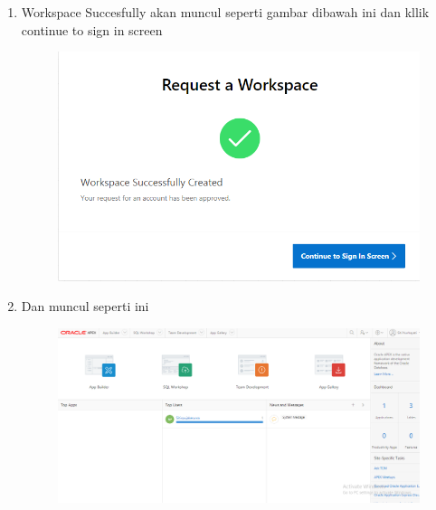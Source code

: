 \begin{enumerate}
	\item Workspace Succesfully akan muncul seperti gambar dibawah ini dan kllik continue to sign in screen
	\begin{figure} [!htbp]
	\includegraphics[scale=0.2]{Apex/11.png}
	\centering
	\end{figure}
	
	\item Dan muncul seperti ini 
	\begin{figure} [!htbp]
	\includegraphics[scale=0.2]{Apex/11a.png}
	\centering
	\end{figure}
	
	
	
\end{enumerate}
